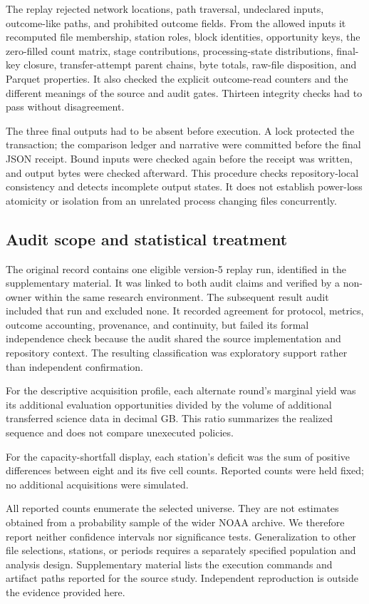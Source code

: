 The replay rejected network locations, path traversal, undeclared inputs, outcome-like paths, and prohibited outcome fields. From the allowed inputs it recomputed file membership, station roles, block identities, opportunity keys, the zero-filled count matrix, stage contributions, processing-state distributions, final-key closure, transfer-attempt parent chains, byte totals, raw-file disposition, and Parquet properties. It also checked the explicit outcome-read counters and the different meanings of the source and audit gates. Thirteen integrity checks had to pass without disagreement.

The three final outputs had to be absent before execution. A lock protected the transaction; the comparison ledger and narrative were committed before the final JSON receipt. Bound inputs were checked again before the receipt was written, and output bytes were checked afterward. This procedure checks repository-local consistency and detects incomplete output states. It does not establish power-loss atomicity or isolation from an unrelated process changing files concurrently.

\subsection{Audit scope and statistical treatment}
The original record contains one eligible version-5 replay run, identified in the supplementary material. It was linked to both audit claims and verified by a non-owner within the same research environment. The subsequent result audit included that run and excluded none. It recorded agreement for protocol, metrics, outcome accounting, provenance, and continuity, but failed its formal independence check because the audit shared the source implementation and repository context. The resulting classification was exploratory support rather than independent confirmation.

For the descriptive acquisition profile, each alternate round's marginal yield was its additional evaluation opportunities divided by the volume of additional transferred science data in decimal GB. This ratio summarizes the realized sequence and does not compare unexecuted policies.

For the capacity-shortfall display, each station's deficit was the sum of positive differences between eight and its five cell counts. Reported counts were held fixed; no additional acquisitions were simulated.

All reported counts enumerate the selected universe. They are not estimates obtained from a probability sample of the wider NOAA archive. We therefore report neither confidence intervals nor significance tests. Generalization to other file selections, stations, or periods requires a separately specified population and analysis design. Supplementary material lists the execution commands and artifact paths reported for the source study. Independent reproduction is outside the evidence provided here.
